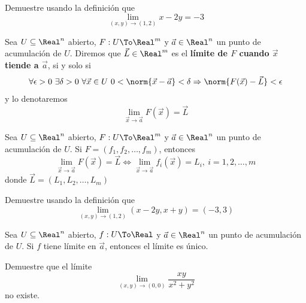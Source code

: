 \begin{frame}
  \begin{eg}
    Demuestre usando la definición que
    $$\lim_{(x,y)\to(1,2)} x-2y=-3$$
  \end{eg}
\end{frame}

\begin{frame}
  \begin{defn}
    Sea $U\subseteq\Real^n$ abierto, $F:U\To\Real^m$ y $\vec{a}\in\Real^n$ un punto de acumulación de $U$. Diremos que $\vec{L}\in\Real^m$ es el \textbf{límite de $F$ cuando $\vec{x}$ tiende a $\vec{a}$}, si y solo si
    $$\forall\epsilon>0\ \exists\delta>0\ \forall\vec{x}\in U\ 0<\norm{\vec{x}-\vec{a}}<\delta\Rightarrow\norm{F(\vec{x})-\vec{L}}<\epsilon$$
    y lo denotaremos
    $$\lim_{\vec{x}\to\vec{a}}F(\vec{x})=\vec{L}$$
  \end{defn}
\end{frame}

\begin{frame}
  \begin{thm}
    Sea $U\subseteq\Real^n$ abierto, $F:U\To\Real^m$ y $\vec{a}\in\Real^n$ un punto de acumulación de $U$. Si $F=(f_1,f_2,\ldots,f_m)$, entonces
    $$\lim_{\vec{x}\to\vec{a}}F(\vec{x})=\vec{L}\Longleftrightarrow\lim_{\vec{x}\to\vec{a}}f_i(\vec{x})=L_i,\ i=1,2,\ldots,m$$
    donde $\vec{L}=(L_1,L_2,\ldots,L_m)$
  \end{thm}
\end{frame}

\begin{frame}
  \begin{eg}
    Demuestre usando la definición que
    $$\lim_{(x,y)\to(1,2)} (x-2y,x+y)=(-3,3)$$
  \end{eg}
\end{frame}

\begin{frame}
  \begin{thm}
    Sea $U\subseteq\Real^n$ abierto, $f:U\To\Real$ y $\vec{a}\in\Real^n$ un punto de acumulación de $U$. Si $f$ tiene límite en $\vec{a}$, entonces el límite es único.
  \end{thm}
\end{frame}

\begin{frame}
  \begin{eg}
    Demuestre que el límite
    $$\lim_{(x,y)\to(0,0)}\dfrac{xy}{x^2+y^2}$$
    no existe.
  \end{eg}
\end{frame}

